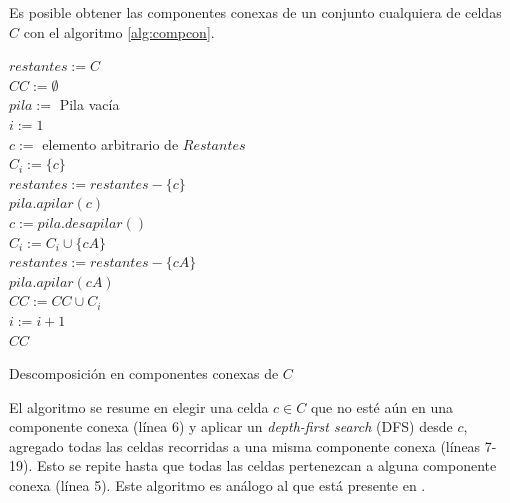 Es posible obtener las componentes conexas de un conjunto cualquiera de
celdas $C$ con el algoritmo \ref{alg:compcon}.

\begin{algorithm}[H]
\SetAlgoLined
  $restantes := C$ \\
  $CC := \emptyset$ \\
  $pila :=$ Pila vacía \\
  $i := 1$ \\
   {
    $c :=$ elemento arbitrario de $Restantes$ \\


    $C_i :=  \{c\}$ \\
    $restantes := restantes - \{c\}$ \\
    $pila.apilar(c)$ \\
     {
      $c := pila.desapilar()$ \\
       {
         {
          $C_i :=  C_i \cup \{cA\}$ \\
          $restantes := restantes - \{cA\}$ \\
          $pila.apilar(cA)$ \\
        }
      }
    }
    $CC := CC \cup C_i$ \\
    $i := i + 1$ \\
  }
  \Return $CC$ 

  \caption{Descomposición en componentes conexas de $C$}
  \label{alg:compcon}
\end{algorithm}

El algoritmo se resume en elegir una celda $c\in C$ que no esté aún en una
componente conexa (línea 6) y aplicar un \emph{depth-first search} (DFS) desde
$c$, agregado todas las celdas recorridas a una misma componente conexa (líneas
7-19). Esto se repite hasta que todas las celdas pertenezcan a alguna
componente conexa (línea 5). Este algoritmo es análogo al que está presente en
\cite{hopcroft1973algorithm}.


